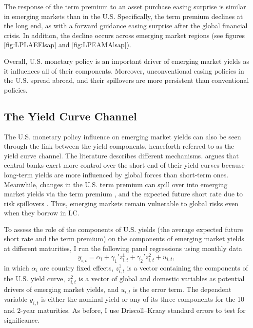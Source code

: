 \documentclass[a4paper, 12pt]{article}
\providecommand{\idxt}{t}
\providecommand{\idxi}{i}
\providecommand{\idxspnl}{\idxi,\idxt}
\providecommand{\yld}{y}
\newcommand{\eqpanelTPreg}{\yld_{\idxspnl} = \alpha_{\idxi} + \gamma_{1}' z^{1}_{\idxspnl} + \gamma_{2}' z^{2}_{\idxspnl} + u_{\idxspnl}}
\begin{document}
The response of the term premium to an asset purchase easing surprise is similar in emerging markets than in the U.S. Specifically, the term premium declines at the long end, as with a forward guidance easing surprise after the global financial crisis. In addition, the decline occurs across emerging market regions (see figures \ref{fig:LPLAEElsap} and \ref{fig:LPEAMAlsap}). 

Overall, U.S. monetary policy is an important driver of emerging market yields as it influences all of their components. Moreover, unconventional easing policies in the U.S. spread abroad, and their spillovers are more persistent than conventional policies. 

\subsection{The Yield Curve Channel} \label{sec:Drivers}
The U.S. monetary policy influence on emerging market yields can also be seen through the link between the yield components, henceforth referred to as the yield curve channel. The literature describes different mechanisms. \cite{Obstfeld:2015} argues that central banks exert more control over the short end of their yield curves because long-term yields are more influenced by global forces than short-term ones. Meanwhile, changes in the U.S. term premium can spill over into emerging market yields via the term premium \citep{Turner:2014}, and the expected future short rate due to risk spillovers \citep{Kalemli-Ozcan:2019}. Thus, emerging markets remain vulnerable to global risks even when they borrow in LC. 

To assess the role of the components of U.S. yields (the average expected future short rate and the term premium) on the components of emerging market yields at different maturities, I run the following panel regressions using monthly data 
\begin{equation} \label{eq:nPanelDCMP}
\eqpanelTPreg ,
\end{equation}
\noindent in which \(\alpha_{\idxi}\) are country fixed effects, \(z^{1}_{\idxspnl}\) is a vector containing the components of the U.S. yield curve, \(z^{2}_{\idxspnl}\) is a vector of global and domestic variables as potential drivers of emerging market yields, and \(u_{\idxspnl}\) is the error term. The dependent variable \(\yld_{\idxspnl}\) is either the nominal yield or any of its three components for the 10- and 2-year maturities. As before, I use Driscoll--Kraay standard errors to test for significance. 
\end{document}
